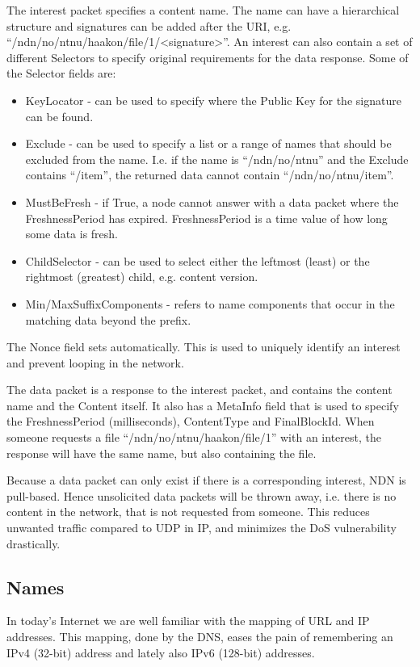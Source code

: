 The \gls{interest} packet specifies a content \gls{name}. 
The \gls{name} can have a hierarchical structure and signatures can be added after the \gls{URI}, e.g. ``/ndn/no/ntnu/haakon/file/1/<signature>''.
An \gls{interest} can also contain a set of different Selectors to specify original requirements for the \gls{data} response. 
Some of the Selector fields are:
\begin{itemize}
  \item KeyLocator - can be used to specify where the Public Key for the signature can be found.
  \item Exclude - can be used to specify a list or a range of names that should be excluded from the \gls{name}. 
  I.e. if the \gls{name} is ``/ndn/no/ntnu'' and the Exclude contains ``/item'', the returned \gls{data} cannot contain ``/ndn/no/ntnu/item''.
  \item MustBeFresh - if True, a \gls{node} cannot answer with a \gls{data} packet where the FreshnessPeriod has expired.
  FreshnessPeriod is a time value of how long some \gls{data} is fresh.
  \item ChildSelector - can be used to select either the leftmost (least) or the rightmost (greatest) child, e.g. content version. 
  \item Min/MaxSuffixComponents - refers to \gls{name} components that occur in the matching \gls{data} beyond the prefix. 
\end{itemize}
The Nonce field sets automatically. 
This is used to uniquely identify an \gls{interest} and prevent looping in the network.

The \gls{data} packet is a response to the \gls{interest} packet, and contains the content \gls{name} and the Content itself.
It also has a MetaInfo field that is used to specify the FreshnessPeriod (milliseconds), ContentType and FinalBlockId. 
When someone requests a file ``/ndn/no/ntnu/haakon/file/1'' with an \gls{interest}, the response will have the same \gls{name}, but also containing the file.

Because a \gls{data} packet can only exist if there is a corresponding \gls{interest}, \gls{NDN} is pull-based.
Hence unsolicited \gls{data} packets will be thrown away, i.e. there is no content in the network, that is not requested from someone.
This reduces unwanted traffic compared to \gls{UDP} in \gls{IP}, and minimizes the \gls{DoS} vulnerability drastically.

\subsection{Names}\label{name}
In today's Internet we are well familiar with the mapping of \gls{URL} and \gls{IP} addresses.
This mapping, done by the \gls{DNS}, eases the pain of remembering an \gls{IPv4} (32-bit) address and lately also \gls{IPv6} (128-bit) addresses.

